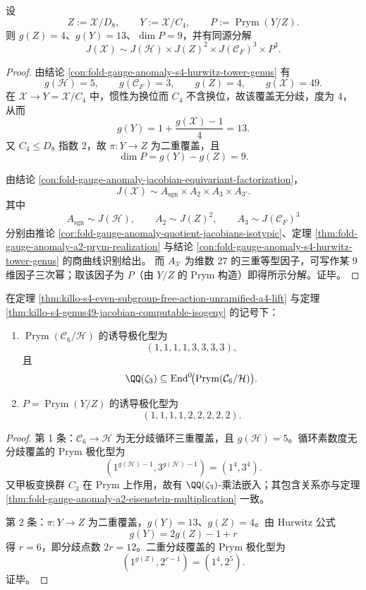 \begin{theorem}\label{thm:killo-s4-genus49-jacobian-computable-isogeny}
设
\[
Z:=\mathcal X/D_8,\qquad
Y:=\mathcal X/C_4,\qquad
P:=\operatorname{Prym}(Y/Z).
\]
则 \(g(Z)=4\)、\(g(Y)=13\)、\(\dim P=9\)，并有同源分解
\[
J(\mathcal X)\sim J(\mathcal H)\times J(Z)^2\times J(\mathcal C_F)^3\times P^3.
\]
\end{theorem}
\begin{proof}
由结论 \ref{con:fold-gauge-anomaly-s4-hurwitz-tower-genus} 有
\[
g(\mathcal H)=5,\qquad g(\mathcal C_F)=3,\qquad g(Z)=4,\qquad g(\mathcal X)=49.
\]
在 \(\mathcal X\to Y=\mathcal X/C_4\) 中，惯性为换位而 \(C_4\) 不含换位，故该覆盖无分歧，度为 \(4\)，从而
\[
g(Y)=1+\frac{g(\mathcal X)-1}{4}=13.
\]
又 \(C_4\le D_8\) 指数 \(2\)，故 \(\pi:Y\to Z\) 为二重覆盖，且
\[
\dim P=g(Y)-g(Z)=9.
\]

由结论 \ref{con:fold-gauge-anomaly-jacobian-equivariant-factorization}，
\[
J(\mathcal X)\sim A_{\mathrm{sgn}}\times A_2\times A_3\times A_{3'}.
\]
其中
\[
A_{\mathrm{sgn}}\sim J(\mathcal H),\qquad
A_2\sim J(Z)^2,\qquad
A_3\sim J(\mathcal C_F)^3
\]
分别由推论 \ref{cor:fold-gauge-anomaly-quotient-jacobians-isotypic}、定理 \ref{thm:fold-gauge-anomaly-a2-prym-realization} 与结论 \ref{con:fold-gauge-anomaly-s4-hurwitz-tower-genus} 的商曲线识别给出。
而 \(A_{3'}\) 为维数 \(27\) 的三重等型因子，可写作某 \(9\) 维因子三次幂；取该因子为 \(P\)（由 \(Y/Z\) 的 Prym 构造）即得所示分解。证毕。
\end{proof}

\begin{proposition}\label{prop:killo-two-prym-polarization-types}
在定理 \ref{thm:killo-s4-even-subgroup-free-action-unramified-a4-lift} 与定理 \ref{thm:killo-s4-genus49-jacobian-computable-isogeny} 的记号下：
\begin{enumerate}
  \item \(\operatorname{Prym}(\mathcal C_6/\mathcal H)\) 的诱导极化型为
  \[
  (1,1,1,1,3,3,3,3),
  \]
  且
  \[
  \QQ(\zeta_3)\subseteq \operatorname{End}^0\!\bigl(\operatorname{Prym}(\mathcal C_6/\mathcal H)\bigr).
  \]
  \item \(P=\operatorname{Prym}(Y/Z)\) 的诱导极化型为
  \[
  (1,1,1,1,2,2,2,2,2).
  \]
\end{enumerate}
\end{proposition}
\begin{proof}
第 1 条：\(\mathcal C_6\to\mathcal H\) 为无分歧循环三重覆盖，且 \(g(\mathcal H)=5\)。循环素数度无分歧覆盖的 Prym 极化型为
\[
(1^{g(\mathcal H)-1},3^{g(\mathcal H)-1})=(1^4,3^4).
\]
又甲板变换群 \(C_3\) 在 Prym 上作用，故有 \(\QQ(\zeta_3)\)-乘法嵌入；其包含关系亦与定理 \ref{thm:fold-gauge-anomaly-a2-eisenstein-multiplication} 一致。

第 2 条：\(\pi:Y\to Z\) 为二重覆盖，\(g(Y)=13\)、\(g(Z)=4\)。由 Hurwitz 公式
\[
g(Y)=2g(Z)-1+r
\]
得 \(r=6\)，即分歧点数 \(2r=12\)。二重分歧覆盖的 Prym 极化型为
\[
(1^{g(Z)},2^{r-1})=(1^4,2^5).
\]
证毕。
\end{proof}

